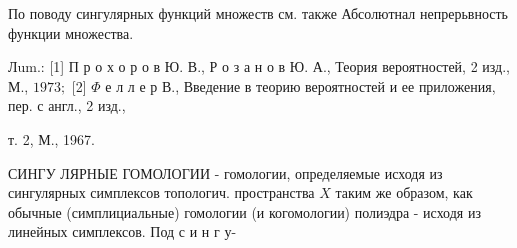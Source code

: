 \documentclass[10pt]{article}
\begin{document}
По поводу сингулярных функций множеств см. также Абсолютнал непрерьвность функции множества.



Лum.: [1] П р о х о р о в Ю. В., Р о з а н о в Ю. А., Теория вероятностей, 2 изд., М., $1973 ;$ [2] $\Phi$ е л л е р В., Введение в теорию вероятностей и ее приложения, пер. с англ., 2 изд.,

т. 2, М., 1967.



СИНГУ ЛЯРНЫЕ ГОМОЛОГИИ - гомологии, определяемые исходя из сингулярных симплексов топологич. пространства $X$ таким же образом, как обычные (симплициальные) гомологии (и когомологии) полиэдра - исходя из линейных симплексов. Под с и н г у-
\end{document}
